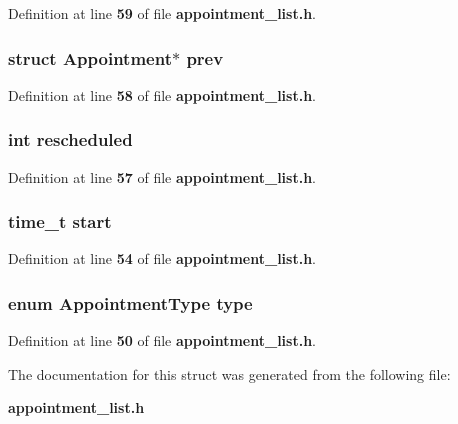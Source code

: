Definition at line {\bf 59} of file {\bf appointment\+\_\+list.\+h}.

\subsubsection[{prev}]{\setlength{\rightskip}{0pt plus 5cm}struct {\bf Appointment}$\ast$ prev}\label{struct_appointment_a76cac42b207c5cf8c9175afad72b7bd2}


Definition at line {\bf 58} of file {\bf appointment\+\_\+list.\+h}.

\subsubsection[{rescheduled}]{\setlength{\rightskip}{0pt plus 5cm}int rescheduled}\label{struct_appointment_a7d53dc414f2d787dc031b868da72e703}


Definition at line {\bf 57} of file {\bf appointment\+\_\+list.\+h}.

\subsubsection[{start}]{\setlength{\rightskip}{0pt plus 5cm}time\+\_\+t start}\label{struct_appointment_ada310e7f72b38fadd4b24d80ed3438ee}


Definition at line {\bf 54} of file {\bf appointment\+\_\+list.\+h}.

\subsubsection[{type}]{\setlength{\rightskip}{0pt plus 5cm}enum {\bf Appointment\+Type} type}\label{struct_appointment_ae7b6c9fdabaf04275e5799e5daf7eecd}


Definition at line {\bf 50} of file {\bf appointment\+\_\+list.\+h}.



The documentation for this struct was generated from the following file\+:\begin{DoxyCompactItemize}
\item 
{\bf appointment\+\_\+list.\+h}\end{DoxyCompactItemize}
